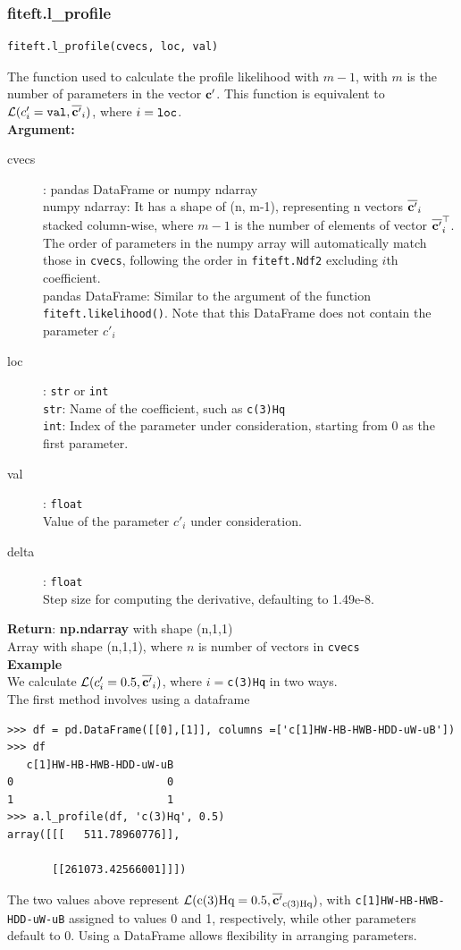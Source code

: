 \documentclass[12pt]{article}
\def\b#1{\boldsymbol{\rm #1}}
\begin{document}
\subsubsection{fiteft.l\_profile}
\begin{verbatim}
fiteft.l_profile(cvecs, loc, val)
\end{verbatim}
The function used to calculate the profile likelihood with $m-1$, with $m$ is the number of parameters in the vector $\b c'$. This function is equivalent to $\mathcal{L}(c'_i= \verb|val|,\overline{\b c'}_i) $, where $i =\verb|loc|$. \\[1cm]
\textbf{Argument:}
\begin{description}
  \item[cvecs]: pandas DataFrame or numpy ndarray\\
  numpy ndarray: It has a shape of (n, m-1), representing n vectors $\overline{\b c'}_i$ stacked column-wise, where $m-1$ is the number of elements of vector $\overline{\b c'}_i^\top$. The order of parameters in the numpy array will automatically match those in \verb|cvecs|, following the order in \verb|fiteft.Ndf2| excluding $i$th coefficient.\\
  pandas DataFrame: Similar to the argument of the function \verb|fiteft.likelihood()|. Note that this DataFrame does not contain the parameter $c'_i$
  \item[loc]: \verb|str| or \verb|int| \\
  \verb|str|: Name of the coefficient, such as \verb|c(3)Hq|\\
  \verb|int|: Index of the parameter under consideration, starting from 0 as the first parameter.
  \item[val]: \verb|float| \\
  Value of the parameter $c'_i$ under consideration.
  \item[delta]: \verb|float| \\
  Step size for computing the derivative, defaulting to 1.49e-8.
 \end{description}
 \textbf{Return}: \textbf{np.ndarray} with shape (n,1,1)\\
 \indent Array with shape (n,1,1), where $n$ is number of vectors in \verb|cvecs|
 \\[1cm]
 \textbf{Example}\\
We calculate $\mathcal{L}(c'_i=0.5,\overline{\b c'}_i)$, where $i=$\verb|c(3)Hq| in two ways.\\
The first method involves using a dataframe
\begin{verbatim}
>>> df = pd.DataFrame([[0],[1]], columns =['c[1]HW-HB-HWB-HDD-uW-uB'])
>>> df
   c[1]HW-HB-HWB-HDD-uW-uB
0                        0
1                        1
>>> a.l_profile(df, 'c(3)Hq', 0.5)
array([[[   511.78960776]],

       [[261073.42566001]]])
\end{verbatim}
The two values above represent $\mathcal{L}(\rm c(3)Hq=0.5,\overline{\b c'}_{c(3)Hq})$, with \verb|c[1]HW-HB-HWB-HDD-uW-uB| assigned to values 0 and 1, respectively, while other parameters default to 0. Using a DataFrame allows flexibility in arranging parameters.
\end{document}
